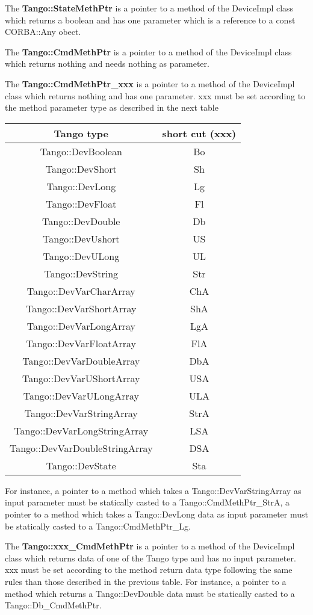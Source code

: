 \vspace{0.3cm}

The \textbf{Tango::StateMethPtr} is a pointer to a method of the DeviceImpl
class which returns a boolean and has one parameter which is a reference
to a const CORBA::Any obect. 

The \textbf{Tango::CmdMethPtr} is a pointer to a method of the DeviceImpl
class which returns nothing and needs nothing as parameter.

The \textbf{Tango::CmdMethPtr\_xxx} is a pointer to a method of the
DeviceImpl class which returns nothing and has one parameter. xxx
must be set according to the method parameter type as described in
the next table

\vspace{0.3cm}

\begin{center}
\begin{longtable}{|c|c|}
\hline 
Tango type & short cut (xxx)\tabularnewline
\hline 
\hline 
Tango::DevBoolean & Bo\tabularnewline
\hline 
Tango::DevShort & Sh\tabularnewline
\hline 
Tango::DevLong & Lg\tabularnewline
\hline 
Tango::DevFloat & Fl\tabularnewline
\hline 
Tango::DevDouble & Db\tabularnewline
\hline 
Tango::DevUshort & US\tabularnewline
\hline 
Tango::DevULong & UL\tabularnewline
\hline 
Tango::DevString & Str\tabularnewline
\hline 
Tango::DevVarCharArray & ChA\tabularnewline
\hline 
Tango::DevVarShortArray & ShA\tabularnewline
\hline 
Tango::DevVarLongArray & LgA\tabularnewline
\hline 
Tango::DevVarFloatArray & FlA\tabularnewline
\hline 
Tango::DevVarDoubleArray & DbA\tabularnewline
\hline 
Tango::DevVarUShortArray & USA\tabularnewline
\hline 
Tango::DevVarULongArray & ULA\tabularnewline
\hline 
Tango::DevVarStringArray & StrA\tabularnewline
\hline 
Tango::DevVarLongStringArray & LSA\tabularnewline
\hline 
Tango::DevVarDoubleStringArray & DSA\tabularnewline
\hline 
Tango::DevState & Sta\tabularnewline
\hline 
\end{longtable}
\par\end{center}

\vspace{0.3cm}

For instance, a pointer to a method which takes a Tango::DevVarStringArray
as input parameter must be statically casted to a Tango::CmdMethPtr\_StrA,
a pointer to a method which takes a Tango::DevLong data as input parameter
must be statically casted to a Tango::CmdMethPtr\_Lg.

The \textbf{Tango::xxx\_CmdMethPtr} is a pointer to a method of the
DeviceImpl class which returns data of one of the Tango type and has
no input parameter. xxx must be set according to the method return
data type following the same rules than those described in the previous
table. For instance, a pointer to a method which returns a Tango::DevDouble
data must be statically casted to a Tango::Db\_CmdMethPtr.

